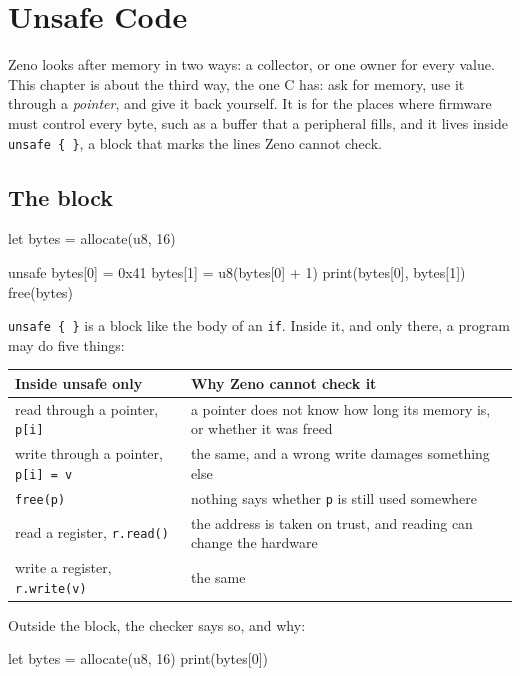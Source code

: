 \chapter{Unsafe Code}\label{ch-unsafe}

Zeno looks after memory in two ways: a collector, or one owner for
every value. This chapter is about the third way, the one C has: ask
for memory, use it through a \emph{pointer}, and give it back yourself.
It is for the places where firmware must control every byte, such as a
buffer that a peripheral fills, and it lives inside \verb|unsafe { }|,
a block that marks the lines Zeno cannot check.

\section{The block}

\begin{zeno}
let bytes = allocate(u8, 16)

unsafe {
    bytes[0] = 0x41
    bytes[1] = u8(bytes[0] + 1)
    print(bytes[0], bytes[1])
    free(bytes)
}
\end{zeno}

\verb|unsafe { }| is a block like the body of an \verb|if|. Inside it,
and only there, a program may do five things:

\begin{center}
\begin{tabular}{lP{7.8cm}}
\toprule
Inside unsafe only & Why Zeno cannot check it \\
\midrule
read through a pointer, \verb|p[i]| & a pointer does not know how long
  its memory is, or whether it was freed \\
write through a pointer, \verb|p[i] = v| & the same, and a wrong write
  damages something else \\
\verb|free(p)| & nothing says whether \verb|p| is still used somewhere \\
read a register, \verb|r.read()| & the address is taken on trust, and
  reading can change the hardware \\
write a register, \verb|r.write(v)| & the same \\
\bottomrule
\end{tabular}
\end{center}

Outside the block, the checker says so, and why:

\begin{zeno}[fails=yes]
let bytes = allocate(u8, 16)
print(bytes[0])
\end{zeno}

